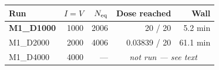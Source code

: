\begin{tabular}{lrrrr}
\toprule
Run & $I=V$ & $N_{\rm eq}$ & Dose reached & Wall \\
\midrule
\bfseries M1\_D1000 & 1000 & 2006 & 20 / 20 & 5.2 min \\
M1\_D2000 & 2000 & 4006 & 0.03839 / 20 & 61.1 min \\
M1\_D4000 & 4000 & --- & \multicolumn{2}{c}{\itshape not run --- see text} \\
\bottomrule
\end{tabular}
